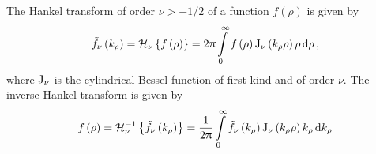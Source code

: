\begin{corollary}
	\label{coll:hankel_transform}
	The Hankel transform of order $\nu > -1/2$ of a function $f\left(\rho\right)$ is
	given by
	\begin{equation}\label{eq:hankel_transform}
		\tilde{f}_\nu \left(k_\rho\right) =
		\mathcal{H}_{\nu} \left\{f\left(\rho\right)\right\} = 
		2\uppi
		\int\limits_{0}^{\infty} 
		f\left(\rho\right)
		\operatorname{J}_{\nu}\left(k_\rho \rho\right)
		\rho \, 
		\mathrm{d} \rho
		\, ,
	\end{equation}
	where $\operatorname{J}_{\nu}$ is the cylindrical Bessel function of first kind and
	of order $\nu$.
	The inverse Hankel transform is given by
	\begin{equation}\label{eq:hankel_transform_inverse}
		f\left(\rho\right) =
		\mathcal{H}^{-1}_{\nu}
		\left\{\tilde{f}_\nu \left(k_\rho\right)\right\} = 
		\frac{1}{2\uppi}
		\int\limits_{0}^{\infty} 
		\tilde{f}_\nu\left(k_\rho\right)
		\operatorname{J}_{\nu}\left(k_\rho \rho\right)
		k_\rho \,
		\mathrm{d} k_\rho
	\end{equation}
\end{corollary}
